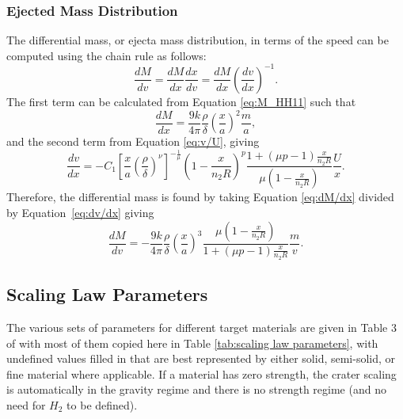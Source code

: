 \documentclass{article}
\begin{document}
\subsubsection{Ejected Mass Distribution}

The differential mass, or ejecta mass distribution, in terms of the speed can be computed using the chain rule as follows:
\begin{equation}\label{eq:dM/dv chain rule}
\frac{dM}{dv} = \frac{dM}{dx}\frac{dx}{dv} = \frac{dM}{dx}\left(\frac{dv}{dx}\right)^{-1}.
\end{equation}
The first term can be calculated from Equation \eqref{eq:M_HH11} such that
\begin{equation}\label{eq:dM/dx}
\frac{dM}{dx} = \frac{9k}{4\pi}\frac{\rho}{\delta}\left(\frac{x}{a}\right)^2\frac{m}{a},
\end{equation}
and the second term from Equation \eqref{eq:v/U}, giving
\begin{equation}\label{eq:dv/dx}
\frac{dv}{dx} = -C_1\left[\frac{x}{a}\left(\frac{\rho}{\delta}\right)^\nu\right]^{-\frac{1}{\mu}}\left(1 - \frac{x}{n_2 R}\right)^p
\frac{1+(\mu p -1)\frac{x}{n_2 R}}{\mu\left(1-\frac{x}{n_2 R}\right)}\frac{U}{x}.
\end{equation}
Therefore, the differential mass is found by taking Equation \eqref{eq:dM/dx} divided by Equation~\eqref{eq:dv/dx} giving
\begin{equation}\label{eq:dM/dv final}
\frac{dM}{dv} = -\frac{9k}{4\pi}\frac{\rho}{\delta}\left(\frac{x}{a}\right)^3\frac{\mu\left(1-\frac{x}{n_2 R}\right)}{1+(\mu p-1)\frac{x}{n_2 R}}\frac{m}{v}.
\end{equation}



\subsection{Scaling Law Parameters}\label{ssec:Scaling Law Parameters}

The various sets of parameters for different target materials are given in Table 3 of \cite{housen2011ejecta} with most of them copied here in Table \ref{tab:scaling law parameters}, with undefined values filled in that are best represented by either solid, semi-solid, or fine material where applicable. If a material has zero strength, the crater scaling is automatically in the gravity regime and there is no strength regime (and no need for $H_2$ to be defined).
\end{document}
